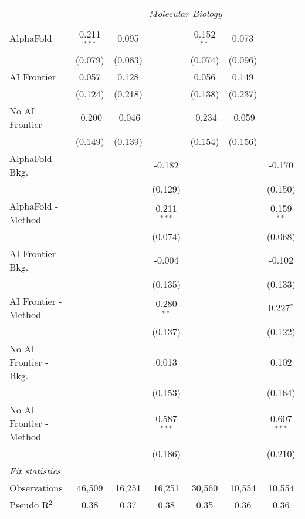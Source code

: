 \begin{tabular}{lcccccc}
 & \multicolumn{6}{c}{\textit{Molecular Biology}} \\ \\
   AlphaFold               & 0.211$^{***}$ & 0.095   &               & 0.152$^{**}$ & 0.073   &   \\   
                           & (0.079)       & (0.083) &               & (0.074)      & (0.096) &   \\   
   AI Frontier             & 0.057         & 0.128   &               & 0.056        & 0.149   &   \\   
                           & (0.124)       & (0.218) &               & (0.138)      & (0.237) &   \\   
   No AI Frontier          & -0.200        & -0.046  &               & -0.234       & -0.059  &   \\   
                           & (0.149)       & (0.139) &               & (0.154)      & (0.156) &   \\   
   AlphaFold - Bkg.        &               &         & -0.182        &              &         & -0.170\\   
                           &               &         & (0.129)       &              &         & (0.150)\\   
   AlphaFold - Method      &               &         & 0.211$^{***}$ &              &         & 0.159$^{**}$\\   
                           &               &         & (0.074)       &              &         & (0.068)\\   
   AI Frontier - Bkg.      &               &         & -0.004        &              &         & -0.102\\   
                           &               &         & (0.135)       &              &         & (0.133)\\   
   AI Frontier - Method    &               &         & 0.280$^{**}$  &              &         & 0.227$^{*}$\\   
                           &               &         & (0.137)       &              &         & (0.122)\\   
   No AI Frontier - Bkg.   &               &         & 0.013         &              &         & 0.102\\   
                           &               &         & (0.153)       &              &         & (0.164)\\   
   No AI Frontier - Method &               &         & 0.587$^{***}$ &              &         & 0.607$^{***}$\\   
                           &               &         & (0.186)       &              &         & (0.210)\\   
   \midrule
   \emph{Fit statistics}\\
   Observations            & 46,509        & 16,251  & 16,251        & 30,560       & 10,554  & 10,554\\  
   Pseudo R$^2$            & 0.38          & 0.37    & 0.38          & 0.35         & 0.36    & 0.36\\  
   

\end{tabular}
